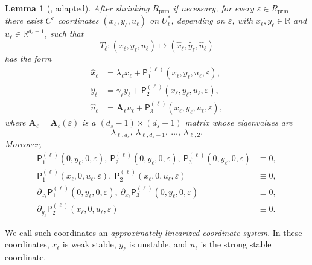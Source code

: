 \documentclass[11pt,a4paper]{article}
\theoremstyle{plain}
\newtheorem{lemma}[theorem]{Lemma}
\theoremstyle{definition}
\theoremstyle{plain}
\numberwithin{equation}{section}
\begin{document}
\begin{lemma}[{\cite[Lemma~6]{GST2008}, adapted}]
\label{lem-ALC}
After shrinking $R_\mathrm{prm}$ if necessary, for every $\varepsilon \in R_\mathrm{prm}$ there exist $C^r$ coordinates $(x_\ell,y_\ell,u_\ell)$ on $U_\ell^*$, depending on $\varepsilon$, with $x_\ell,y_\ell \in \mathbb{R}$ and $u_\ell \in \mathbb{R}^{d_s-1}$, such that
\[
T_\ell : (x_\ell,y_\ell,u_\ell) \longmapsto (\widehat{x}_\ell,\widehat{y}_\ell,\widehat{u}_\ell)
\]
has the form
\begin{align*}
\widehat{x}_\ell &= \lambda_\ell x_\ell + \mathsf{P}_1^{(\ell)}(x_\ell,y_\ell,u_\ell,\varepsilon), \\
\widehat{y}_\ell &= \gamma_\ell y_\ell + \mathsf{P}_2^{(\ell)}(x_\ell,y_\ell,u_\ell,\varepsilon), \\
\widehat{u}_\ell &= \mathbf{A}_\ell u_\ell + \mathsf{P}_3^{(\ell)}(x_\ell,y_\ell,u_\ell,\varepsilon),
\end{align*}
where $\mathbf{A}_\ell = \mathbf{A}_\ell(\varepsilon)$ is a $(d_s - 1)\times(d_s - 1)$ matrix whose eigenvalues are
\[
\lambda_{\ell,d_s},\ \lambda_{\ell,d_s-1},\ \dots,\ \lambda_{\ell,2}.
\]
Moreover,
\begin{align*}
\mathsf{P}_1^{(\ell)}(0,y_\ell,0,\varepsilon),\ \mathsf{P}_2^{(\ell)}(0,y_\ell,0,\varepsilon),\ \mathsf{P}_3^{(\ell)}(0,y_\ell,0,\varepsilon) &\equiv 0, \\
\mathsf{P}_1^{(\ell)}(x_\ell,0,u_\ell,\varepsilon),\ \mathsf{P}_2^{(\ell)}(x_\ell,0,u_\ell,\varepsilon) &\equiv 0, \\
\partial_{x_\ell} \mathsf{P}_1^{(\ell)}(0,y_\ell,0,\varepsilon),\ \partial_{x_\ell} \mathsf{P}_3^{(\ell)}(0,y_\ell,0,\varepsilon) &\equiv 0, \\
\partial_{y_\ell} \mathsf{P}_2^{(\ell)}(x_\ell,0,u_\ell,\varepsilon) &\equiv 0.
\end{align*}
\end{lemma}

We call such coordinates an \emph{approximately linearized coordinate system}. In these coordinates, $x_\ell$ is weak stable, $y_\ell$ is unstable, and $u_\ell$ is the strong stable coordinate.
\end{document}
